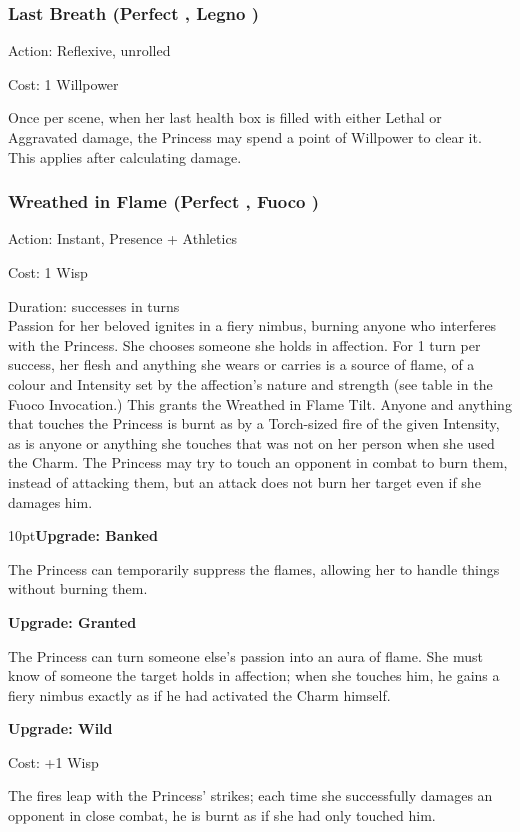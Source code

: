 \subsubsection*{Last Breath (Perfect \textbullet\textbullet, Legno \textbullet\textbullet)}

\noindent Action: Reflexive, unrolled

\noindent Cost: 1 Willpower 

Once per scene, when her last health box is filled with either Lethal or Aggravated damage, the Princess may spend a point of Willpower to clear it. This applies after calculating damage. 

\subsubsection*{Wreathed in Flame (Perfect \textbullet\textbullet, Fuoco \textbullet)}

\noindent Action: Instant, Presence + Athletics

\noindent Cost: 1 Wisp

\noindent Duration: successes in turns \\

\noindent Passion for her beloved ignites in a fiery nimbus, burning anyone who interferes with the Princess. She chooses someone she holds in affection. For 1 turn per success, her flesh and anything she wears or carries is a source of flame, of a colour and Intensity set by the affection's nature and strength (see table in the Fuoco Invocation.) This grants the Wreathed in Flame Tilt.  Anyone and anything that touches the Princess is burnt as by a Torch-sized fire of the given Intensity, as is anyone or anything she touches that was not on her person when she used the Charm. The Princess may try to touch an opponent in combat to burn them, instead of attacking them, but an attack does not burn her target even if she damages him.

\begin{myindentpar}{10pt}\textbf{Upgrade: Banked}

The Princess can temporarily suppress the flames, allowing her to handle things without burning them. 

\textbf{Upgrade: Granted}

The Princess can turn someone else's passion into an aura of flame. She must know of someone the target holds in affection; when she touches him, he gains a fiery nimbus exactly as if he had activated the Charm himself.

\textbf{Upgrade: Wild}

\noindent Cost: +1 Wisp

The fires leap with the Princess' strikes; each time she successfully damages an opponent in close combat, he is burnt as if she had only touched him.\end{myindentpar}


